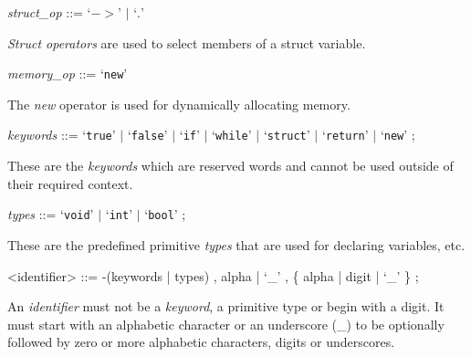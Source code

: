 \documentclass[a4paper,11pt]{article}
\begin{document}
\noindent\textit{struct\_op} ::=
    `$->$'
    $|$ `$.$'

\noindent\textit{Struct operators} are used to select members of a struct variable.
    
\noindent\textit{memory\_op} ::=
    `\verb+new+'
    
\noindent The \textit{new} operator is used for dynamically allocating memory.

\noindent\textit{keywords} ::=
    `\verb+true+' $|$ `\verb+false+' $|$ `\verb+if+' $|$ `\verb+while+' $|$ `\verb+struct+' $|$ `\verb+return+' $|$ `\verb+new+'
    ;

\noindent These are the \textit{keywords} which are reserved words and cannot be used outside of their required context.

\noindent\textit{types} ::=
    `\verb+void+' $|$ `\verb+int+' $|$ `\verb+bool+' ;
    
\noindent These are the predefined primitive \textit{types} that are used for declaring variables, etc.

\begin{grammar}
<identifier> ::=
	-(keywords | types) ,
	alpha | `\_' , \{ alpha | digit | `\_' \} ;
\end{grammar}
An \textit{identifier} must not be a \textit{keyword}, a primitive type or begin with a digit. It must start with an alphabetic character or an underscore (\_) to be optionally followed by zero or more alphabetic characters, digits or underscores. 
\end{document}
